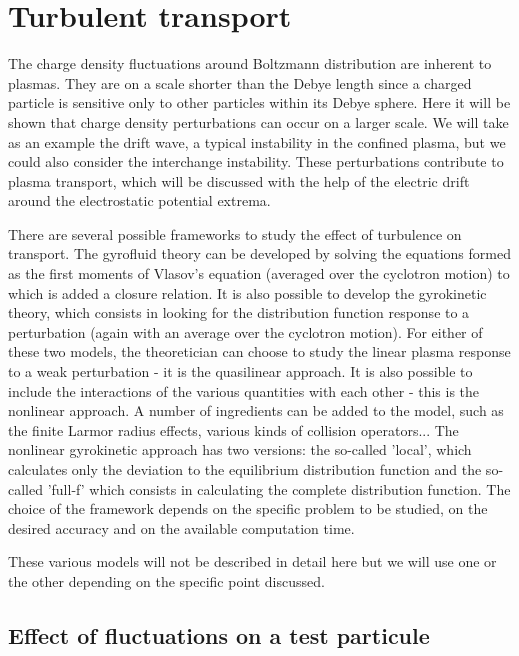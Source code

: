 \chapter{Turbulent transport}
\label{chap:TransportTurbulent}

The charge density fluctuations around Boltzmann distribution are inherent to plasmas. They are on a scale shorter than the Debye length since a charged particle is sensitive only to other particles within its Debye sphere. Here it will be shown that charge density perturbations can occur on a larger scale. We will take as an example the drift wave, a typical instability in the confined plasma, but we could also consider the interchange instability. These perturbations contribute to plasma transport, which will be discussed with the help of the electric drift around the electrostatic potential extrema.

There are several possible frameworks to study the effect of turbulence on transport. The gyrofluid theory can be developed by solving the equations formed as the first moments of Vlasov's equation (averaged over the cyclotron motion) to which is added a closure relation. It is also possible to develop the gyrokinetic theory, which consists in looking for the distribution function response to a perturbation (again with an average over the cyclotron motion). For either of these two models, the theoretician can choose to study the linear plasma response to a weak perturbation - it is the quasilinear approach. It is also possible to include the interactions of the various quantities with each other - this is the nonlinear approach. A number of ingredients can be added to the model, such as the finite Larmor radius effects, various kinds of collision operators... The nonlinear gyrokinetic approach has two versions: the so-called 'local', which calculates only the deviation to the equilibrium distribution function and the so-called 'full-f' which consists in calculating the complete distribution function. The choice of the framework depends on the specific problem to be studied, on the desired accuracy and on the available computation time.

These various models will not be described in detail here but we will use one or the other depending on the specific point discussed.



		\section{Effect of fluctuations on a test particule}
		\label{sec:FluctuationsParticuleTest}
		
